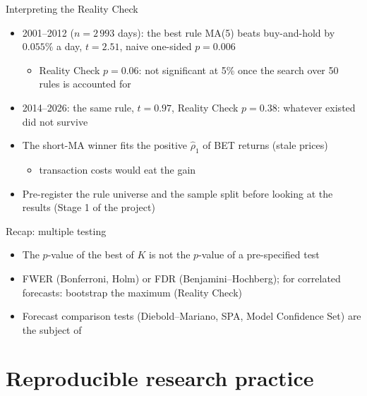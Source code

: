 \begin{frame}{Interpreting the Reality Check}
\itemsize{\footnotesize}
\begin{itemize}
    \item 2001--2012 ($n = 2\,993$ days): the best rule MA(5) beats buy-and-hold by $0.055\%$ a day, $t = 2.51$, naive one-sided $p = 0.006$
    \begin{itemize}
        \item Reality Check $p = 0.06$: not significant at 5\% once the search over 50 rules is accounted for
    \end{itemize}
    \item 2014--2026: the same rule, $t = 0.97$, Reality Check $p = 0.38$: whatever existed did not survive
    \item The short-MA winner fits the positive $\hat\rho_1$ of BET returns (stale prices)
    \begin{itemize}
        \item transaction costs would eat the gain
    \end{itemize}
    \item Pre-register the rule universe and the sample split before looking at the results (Stage 1 of the project)
\end{itemize}
\end{frame}

\begin{frame}{Recap: multiple testing}
\itemsize{\small}
\begin{itemize}
    \item The $p$-value of the best of $K$ is not the $p$-value of a pre-specified test
    \item FWER (Bonferroni, Holm) or FDR (Benjamini--Hochberg); for correlated forecasts: bootstrap the maximum (Reality Check)
    \item Forecast comparison tests (Diebold--Mariano, SPA, Model Confidence Set) are the subject of 
\end{itemize}
\end{frame}


\section{Reproducible research practice}

